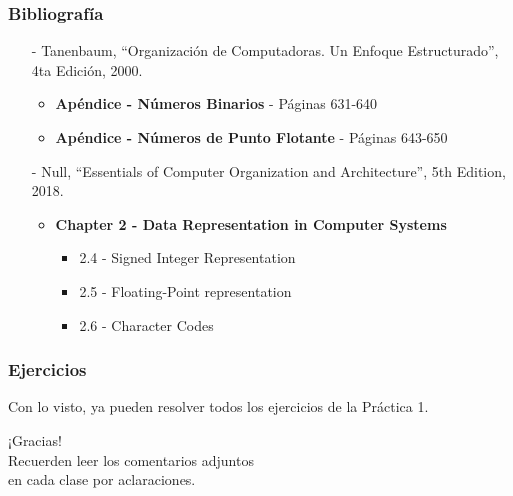 \documentclass[aspectratio=169]{beamer}
\begin{document}
\begin{frame}[fragile]
    \frametitle{Bibliografía}
    \begin{itemize}
     \setlength\itemsep{0.5cm}
    \item[-] \small Tanenbaum, “Organización de Computadoras. Un Enfoque Estructurado”, 4ta Edición, 2000.\\
    \begin{itemize}
     \item \textbf{Apéndice - Números Binarios} - Páginas 631-640
     \item \textbf{Apéndice - Números de Punto Flotante} - Páginas 643-650
    \end{itemize}
    \item[-] \small Null, “Essentials of Computer Organization and Architecture”, 5th Edition, 2018.\\
    \begin{itemize}
     \item \textbf{Chapter 2 - Data Representation in Computer Systems}
     \begin{itemize}
      \item 2.4 - Signed Integer Representation
      \item 2.5 - Floating-Point representation
      \item 2.6 - Character Codes
     \end{itemize}
    \end{itemize}
    \end{itemize}
\end{frame}

 \begin{frame}[fragile]
    \frametitle{Ejercicios}
    Con lo visto, ya pueden resolver todos los ejercicios de la Práctica 1.
\end{frame}

\begin{frame}[plain]
    \begin{center}
    \vspace{2cm}
    \huge ¡Gracias!\\
    \vspace{2cm}
    \normalsize Recuerden leer los comentarios adjuntos\\ en cada clase por aclaraciones.
    \end{center}
\end{frame}
\end{document}
